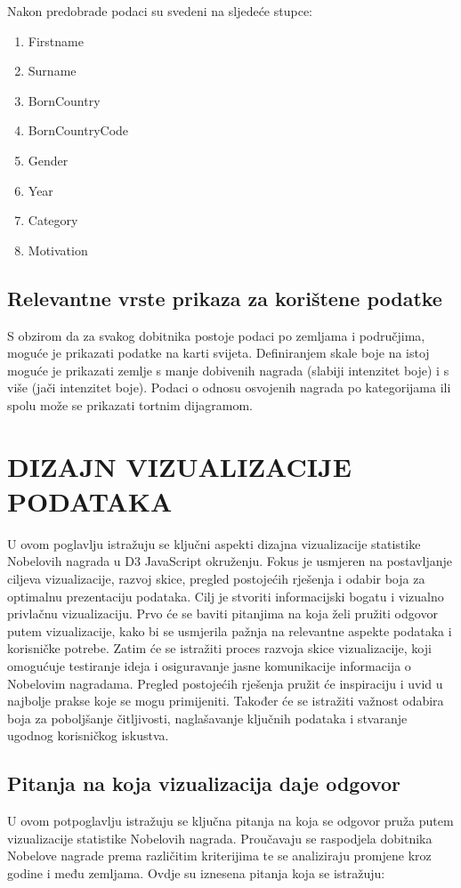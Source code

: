 \documentclass[12pt]{article}
\numberwithin{equation}{section}
\begin{document}
Nakon predobrade podaci su svedeni na sljedeće stupce:
\begin{multicols}{2}
    \begin{enumerate}
        \item Firstname
        \item Surname
        \item BornCountry
        \item BornCountryCode
        \item Gender
        \item Year
        \item Category
        \item Motivation
    \end{enumerate}
\end{multicols}
\subsection{Relevantne vrste prikaza za korištene podatke}
S obzirom da za svakog dobitnika postoje podaci po zemljama i područjima, moguće je prikazati podatke na karti svijeta. Definiranjem skale boje na istoj moguće je prikazati zemlje s manje dobivenih nagrada (slabiji intenzitet boje) i s više (jači intenzitet boje). Podaci o odnosu osvojenih nagrada po kategorijama ili spolu može se prikazati tortnim dijagramom.
\newpage
\section{DIZAJN VIZUALIZACIJE PODATAKA}
U ovom poglavlju istražuju se ključni aspekti dizajna vizualizacije statistike Nobelovih nagrada u D3 JavaScript okruženju. Fokus je usmjeren na postavljanje ciljeva vizualizacije, razvoj skice, pregled postojećih rješenja i odabir boja za optimalnu prezentaciju podataka. Cilj je stvoriti informacijski bogatu i vizualno privlačnu vizualizaciju. Prvo će se baviti pitanjima na koja želi pružiti odgovor putem vizualizacije, kako bi se usmjerila pažnja na relevantne aspekte podataka i korisničke potrebe. Zatim će se istražiti proces razvoja skice vizualizacije, koji omogućuje testiranje ideja i osiguravanje jasne komunikacije informacija o Nobelovim nagradama. Pregled postojećih rješenja pružit će inspiraciju i uvid u najbolje prakse koje se mogu primijeniti. Također će se istražiti važnost odabira boja za poboljšanje čitljivosti, naglašavanje ključnih podataka i stvaranje ugodnog korisničkog iskustva.
\subsection{Pitanja na koja vizualizacija daje odgovor}
U ovom potpoglavlju istražuju se ključna pitanja na koja se odgovor pruža putem vizualizacije statistike Nobelovih nagrada. Proučavaju se raspodjela dobitnika Nobelove nagrade prema različitim kriterijima te se analiziraju promjene kroz godine i među zemljama. Ovdje su iznesena pitanja koja se istražuju:
\end{document}
